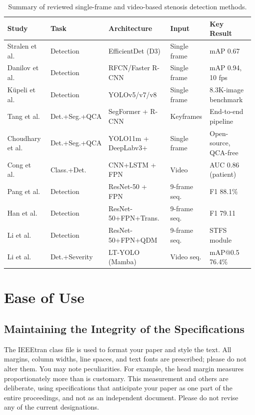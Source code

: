 \documentclass[conference]{IEEEtran}
\begin{document}
\begin{table}[!t]
\centering
\caption{Summary of reviewed single-frame and video-based stenosis detection methods.}
\label{tab:summary}
\footnotesize
\begin{tabular}{p{3.5cm} p{2.2cm} p{3.4cm} p{2.0cm} p{3.0cm}}
\hline
\textbf{Study} & \textbf{Task} & \textbf{Architecture} & \textbf{Input} & \textbf{Key Result} \\
\hline
Stralen et al.~\cite{attentionstenosis} & Detection & EfficientDet (D3) & Single frame & mAP 0.67 \\
Danilov et al.~\cite{Danilov2021} & Detection & RFCN/Faster R-CNN & Single frame & mAP 0.94, 10 fps \\
K\"upeli et al.~\cite{kupeli2025yolo} & Detection & YOLOv5/v7/v8 & Single frame & 8.3K-image benchmark \\
Tang et al.~\cite{aipoweredrealtime} & Det.+Seg.+QCA & SegFormer + R-CNN & Keyframes & End-to-end pipeline \\
Choudhary et al.~\cite{choudhary2026odysseiopensourceendtoendframework} & Det.+Seg.+QCA & YOLO11m + DeepLabv3+ & Single frame & Open-source, QCA-free \\
Cong et al.~\cite{fvcm} & Class.+Det. & CNN+LSTM + FPN & Video & AUC 0.86 (patient) \\
Pang et al.~\cite{PANG2021101900} & Detection & ResNet-50 + FPN & 9-frame seq. & F1 88.1\% \\
Han et al.~\cite{HAN2023106546} & Detection & ResNet-50+FPN+Trans. & 9-frame seq. & F1 79.11 \\
Li et al.~\cite{STQD-Det} & Detection & ResNet-50+FPN+QDM & 9-frame seq. & STFS module \\
Li et al.~\cite{li2025ltyolo} & Det.+Severity & LT-YOLO (Mamba) & Video seq. & mAP@0.5 76.4\% \\
\hline
\end{tabular}
\end{table}

\section{Ease of Use}

\subsection{Maintaining the Integrity of the Specifications}

The IEEEtran class file is used to format your paper and style the text. All margins, 
column widths, line spaces, and text fonts are prescribed; please do not 
alter them. You may note peculiarities. For example, the head margin
measures proportionately more than is customary. This measurement 
and others are deliberate, using specifications that anticipate your paper 
as one part of the entire proceedings, and not as an independent document. 
Please do not revise any of the current designations.
\end{document}
